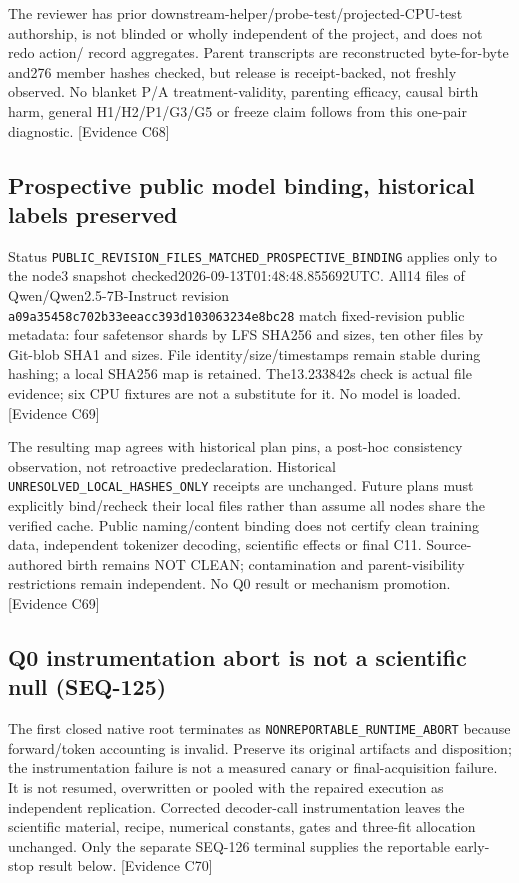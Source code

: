 \documentclass[11pt]{article}
\newcommand{\ev}[1]{\textsf{[Evidence #1]}}
\begin{document}
The reviewer has prior downstream-helper/probe-test/projected-CPU-test authorship,
is not blinded or wholly independent of the project, and does not redo action/
record aggregates. Parent transcripts are reconstructed byte-for-byte and276
member hashes checked, but release is receipt-backed, not freshly observed.
No blanket P/A treatment-validity, parenting efficacy, causal birth harm,
general H1/H2/P1/G3/G5 or freeze claim follows from this one-pair diagnostic.
\ev{C68}

\subsection{Prospective public model binding, historical labels preserved}
Status \texttt{PUBLIC\_REVISION\_FILES\_MATCHED\_PROSPECTIVE\_BINDING} applies
only to the node3 snapshot checked2026-09-13T01:48:48.855692UTC. All14 files
of Qwen/Qwen2.5-7B-Instruct revision
\texttt{a09a35458c702b33eeacc393d103063234e8bc28} match fixed-revision public
metadata: four safetensor shards by LFS SHA256 and sizes, ten other files by
Git-blob SHA1 and sizes. File identity/size/timestamps remain stable during
hashing; a local SHA256 map is retained. The13.233842s check is actual file
evidence; six CPU fixtures are not a substitute for it. No model is loaded.
\ev{C69}

The resulting map agrees with historical plan pins, a post-hoc consistency
observation, not retroactive predeclaration. Historical
\texttt{UNRESOLVED\_LOCAL\_HASHES\_ONLY} receipts are unchanged. Future plans
must explicitly bind/recheck their local files rather than assume all nodes
share the verified cache. Public naming/content binding does not certify clean
training data, independent tokenizer decoding, scientific effects or final C11.
Source-authored birth remains NOT CLEAN; contamination and parent-visibility
restrictions remain independent. No Q0 result or mechanism promotion. \ev{C69}

\subsection{Q0 instrumentation abort is not a scientific null (SEQ-125)}
The first closed native root terminates as
\texttt{NONREPORTABLE\_RUNTIME\_ABORT} because forward/token accounting is
invalid. Preserve its original artifacts and disposition; the instrumentation
failure is not a measured canary or final-acquisition failure. It is not resumed,
overwritten or pooled with the repaired execution as independent replication.
Corrected decoder-call instrumentation leaves the scientific material, recipe,
numerical constants, gates and three-fit allocation unchanged. Only the separate
SEQ-126 terminal supplies the reportable early-stop result below. \ev{C70}
\end{document}
